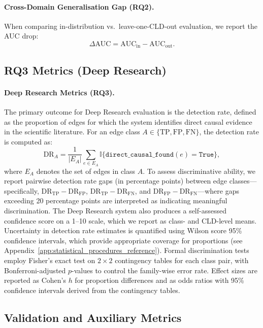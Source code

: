 \paragraph{Cross-Domain Generalisation Gap (RQ2).}
When comparing in-distribution vs.\ leave-one-CLD-out evaluation, we report the AUC drop:
\begin{equation}
    \Delta \text{AUC} = \text{AUC}_{\text{in}} - \text{AUC}_{\text{out}}.
\end{equation}

\subsection{RQ3 Metrics (Deep Research)}
\label{sec:metrics_rq3}

\paragraph{Deep Research Metrics (RQ3).}
The primary outcome for Deep Research evaluation is the detection rate, defined as the proportion of edges for which the system identifies direct causal evidence in the scientific literature. For an edge class $A\in\{\text{TP},\text{FP},\text{FN}\}$, the detection rate is computed as:
\[
\text{DR}_{A}=\frac{1}{|E_A|}\sum_{e\in E_A}\mathbb{I}\{\texttt{direct\_causal\_found}(e)=\texttt{True}\},
\]
where $E_A$ denotes the set of edges in class $A$. To assess discriminative ability, we report pairwise detection rate gaps (in percentage points) between edge classes---specifically, $\text{DR}_{\text{TP}} - \text{DR}_{\text{FP}}$, $\text{DR}_{\text{TP}} - \text{DR}_{\text{FN}}$, and $\text{DR}_{\text{FP}} - \text{DR}_{\text{FN}}$---where gaps exceeding 20 percentage points are interpreted as indicating meaningful discrimination. The Deep Research system also produces a self-assessed confidence score on a 1--10 scale, which we report as class- and CLD-level means. Uncertainty in detection rate estimates is quantified using Wilson score 95\% confidence intervals, which provide appropriate coverage for proportions (see Appendix~\ref{app:statistical_procedures_reference}). Formal discrimination tests employ Fisher's exact test on $2\times2$ contingency tables for each class pair, with Bonferroni-adjusted $p$-values to control the family-wise error rate. Effect sizes are reported as Cohen's $h$ for proportion differences and as odds ratios with 95\% confidence intervals derived from the contingency tables.

\subsection{Validation and Auxiliary Metrics}
\label{sec:metrics_validation}

